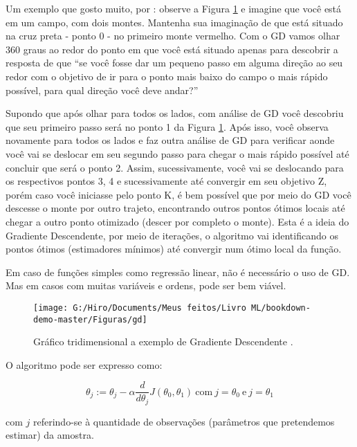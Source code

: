 \documentclass[
]{book}
\begin{document}
Um exemplo que gosto muito, por \citet{andrewcoursera}: observe a Figura \ref{fig:gd} e imagine que você está em um campo, com dois montes. Mantenha sua imaginação de que está situado na cruz preta - ponto 0 - no primeiro monte vermelho. Com o GD vamos olhar 360 graus ao redor do ponto em que você está situado apenas para descobrir a resposta de que ``se você fosse dar um pequeno passo em alguma direção ao seu redor com o objetivo de ir para o ponto mais baixo do campo o mais rápido possível, para qual direção você deve andar?''

Supondo que após olhar para todos os lados, com análise de GD você descobriu que seu primeiro passo será no ponto 1 da Figura \ref{fig:gd}. Após isso, você observa novamente para todos os lados e faz outra análise de GD para verificar aonde você vai se deslocar em seu segundo passo para chegar o mais rápido possível até concluir que será o ponto 2. Assim, sucessivamente, você vai se deslocando para os respectivos pontos 3, 4 e sucessivamente até convergir em seu objetivo Z, porém caso você iniciasse pelo ponto K, é bem possível que por meio do GD você descesse o monte por outro trajeto, encontrando outros pontos ótimos locais até chegar a outro ponto otimizado (descer por completo o monte). Esta é a ideia do Gradiente Descendente, por meio de iterações, o algoritmo vai identificando os pontos ótimos (estimadores mínimos) até convergir num ótimo local da função.

Em caso de funções simples como regressão linear, não é necessário o uso de GD. Mas em casos com muitas variáveis e ordens, pode ser bem viável.

\begin{figure}

{\centering \texttt{[image: G:/Hiro/Documents/Meus feitos/Livro ML/bookdown-demo-master/Figuras/gd]} 

}

\caption{Gráfico tridimensional a exemplo de Gradiente Descendente \citep{andrewcoursera}.}\label{fig:gd}
\end{figure}



O algoritmo pode ser expresso como:

\begin{equation}
    \theta_j := \theta_j - \alpha \frac{d}{d \theta_j}J(\theta_0,\theta_1) \ \mbox{com} \ j=\theta_0 \ \mbox{e} \ j=\theta_1 
    \label{eq:GD}
\end{equation}

com \(j\) referindo-se à quantidade de observações (parâmetros que pretendemos estimar) da amostra.
\end{document}
